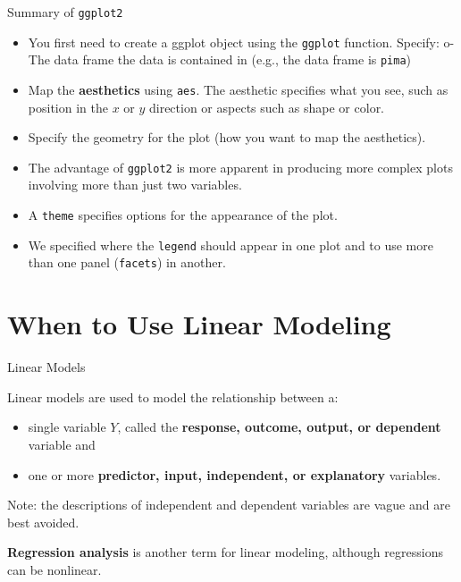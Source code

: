 \begin{frame}[fragile]{Summary of \texttt{ggplot2}}
\protect\hypertarget{summary-of-ggplot2}{}

\begin{itemize}
\tightlist
\item
  You first need to create a ggplot object using the \texttt{ggplot}
  function. Specify: o- The data frame the data is contained in (e.g.,
  the data frame is \texttt{pima})
\item
  Map the \textbf{aesthetics} using \texttt{aes}. The aesthetic
  specifies what you see, such as position in the \(x\) or \(y\)
  direction or aspects such as shape or color.
\item
  Specify the geometry for the plot (how you want to map the
  aesthetics).
\item
  The advantage of \texttt{ggplot2} is more apparent in producing more
  complex plots involving more than just two variables.
\item
  A \texttt{theme} specifies options for the appearance of the plot.
\item
  We specified where the \texttt{legend} should appear in one plot and
  to use more than one panel (\texttt{facets}) in another.
\end{itemize}

\end{frame}

\hypertarget{when-to-use-linear-modeling}{%
\section{When to Use Linear
Modeling}\label{when-to-use-linear-modeling}}

\begin{frame}{Linear Models}
\protect\hypertarget{linear-models}{}

Linear models are used to model the relationship between a:

\begin{itemize}
\tightlist
\item
  single variable \(Y\), called the \textbf{response, outcome, output,
  or dependent} variable and
\item
  one or more \textbf{predictor, input, independent, or explanatory}
  variables.
\end{itemize}

Note: the descriptions of independent and dependent variables are vague
and are best avoided.

\textbf{Regression analysis} is another term for linear modeling,
although regressions can be nonlinear.

\end{frame}

